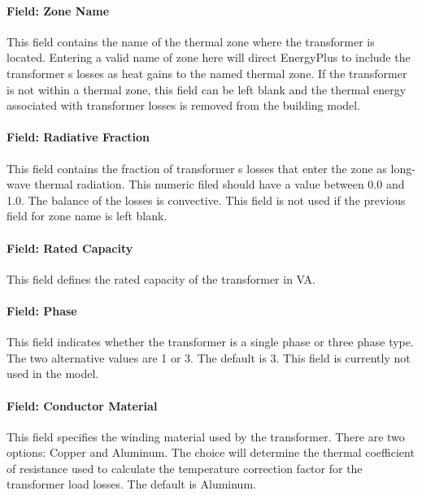 \paragraph{Field: Zone Name}\label{field-zone-name-005}

This field contains the name of the thermal zone where the transformer is located. Entering a valid name of zone here will direct EnergyPlus to include the transformer s losses as heat gains to the named thermal zone. If the transformer is not within a thermal zone, this field can be left blank and the thermal energy associated with transformer losses is removed from the building model.

\paragraph{Field: Radiative Fraction}\label{field-radiative-fraction}

This field contains the fraction of transformer s losses that enter the zone as long-wave thermal radiation. This numeric filed should have a value between 0.0 and 1.0. The balance of the losses is convective. This field is not used if the previous field for zone name is left blank.

\paragraph{Field: Rated Capacity}\label{field-rated-capacity}

This field defines the rated capacity of the transformer in VA.

\paragraph{Field: Phase}\label{field-phase}

This field indicates whether the transformer is a single phase or three phase type. The two alternative values are 1 or 3. The default is 3. This field is currently not used in the model.

\paragraph{Field: Conductor Material}\label{field-conductor-material}

This field specifies the winding material used by the transformer. There are two options: Copper and Aluminum. The choice will determine the thermal coefficient of resistance used to calculate the temperature correction factor for the transformer load losses. The default is Aluminum.

